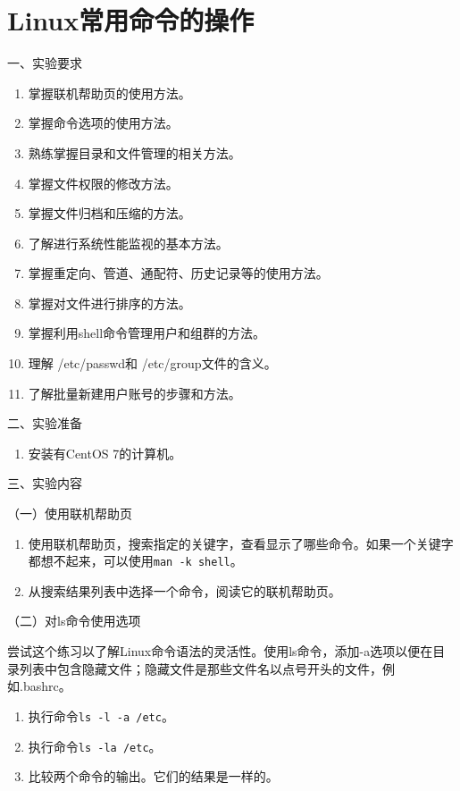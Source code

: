 \chapter{Linux常用命令的操作}

\noindent
一、实验要求
\begin{enumerate}
  \item 掌握联机帮助页的使用方法。
  \item 掌握命令选项的使用方法。
  \item 熟练掌握目录和文件管理的相关方法。
  \item 掌握文件权限的修改方法。
  \item 掌握文件归档和压缩的方法。
  \item 了解进行系统性能监视的基本方法。
  \item 掌握重定向、管道、通配符、历史记录等的使用方法。
  \item 掌握对文件进行排序的方法。
  \item 掌握利用shell命令管理用户和组群的方法。
  \item 理解 /etc/passwd和 /etc/group文件的含义。
  \item 了解批量新建用户账号的步骤和方法。
\end{enumerate}

\vspace{0.2in}
\noindent
二、实验准备
\begin{enumerate}
  \item 安装有CentOS 7的计算机。
\end{enumerate}

\vspace{0.2in}
\noindent
三、实验内容

\vspace{0.1in}
（一）使用联机帮助页
\begin{enumerate}
  \item 使用联机帮助页，搜索指定的关键字，查看显示了哪些命令。如果一个关键字都想不起来，可以使用\verb|man -k shell|。
  \item 从搜索结果列表中选择一个命令，阅读它的联机帮助页。
\end{enumerate}

\vspace{0.1in}
（二）对ls命令使用选项

尝试这个练习以了解Linux命令语法的灵活性。使用ls命令，添加-a选项以便在目录列表中包含隐藏文件；隐藏文件是那些文件名以点号开头的文件，例如.bashrc。
\begin{enumerate}
  \item 执行命令\verb|ls -l -a /etc|。
  \item 执行命令\verb|ls -la /etc|。
  \item 比较两个命令的输出。它们的结果是一样的。
\end{enumerate}

